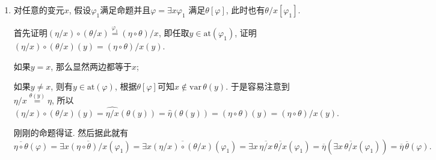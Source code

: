 \begin{enumerate}
    \vspace{3pt}
    \item 对任意的变元$x$, 假设$\varphi_1$满足命题并且$\varphi=\exists x\varphi_1$
    满足$\theta[\varphi]$, 此时也有$\theta/x[\varphi_1]$.

    \vspace{3pt}\hspace{2.17em}
    首先证明$(\eta/x)\circ(\theta/x)\overset{\displaystyle\varphi_1}{=}
    (\eta\circ\theta)/x$, 即任取$y\in\mathrm{at}(\varphi_1)$,
    证明$(\eta/x)\circ(\theta/x)(y)=(\eta\circ\theta)/x(y)$.

    \vspace{3pt}\hspace{2.17em}
    如果$y=x$, 那么显然两边都等于$x$;
    
    \hspace{2.17em}
    如果$y\neq x$, 则有$y\in\mathrm{at}(\varphi)$,
    根据$\theta[\varphi]$可知$x\notin\mathrm{var}\,\theta(y)$. 于是容易注意到
    $\eta/x\overset{\displaystyle\theta(y)}{=}\eta$, 所以
    \vspace{3pt}
    \[
        (\eta/x)\circ(\theta/x)(y)=\widehat{\eta/x}(\theta(y))=
        \widehat{\eta}(\theta(y))=(\eta\circ\theta)(y)=(\eta\circ\theta)/x(y).
    \]

    \vspace{3pt}\hspace{2.17em}
    刚刚的命题得证. 然后据此就有
    \begin{equation*}
        \overline{\eta\circ\theta}(\varphi)=
        \exists x\overline{(\eta\circ\theta)/x}(\varphi_1)=
        \exists x\overline{(\eta/x)\circ(\theta/x)}(\varphi_1)=
        \exists x\,\overline{\eta/x}\,\overline{\theta/x}(\varphi_1)=
        \overline{\eta}\left(\exists x\,\overline{\theta/x}(\varphi_1)\right)=
        \overline{\eta}\,\overline{\theta}(\varphi).
    \tag*{\qedsymbol}\end{equation*}
\end{enumerate}




